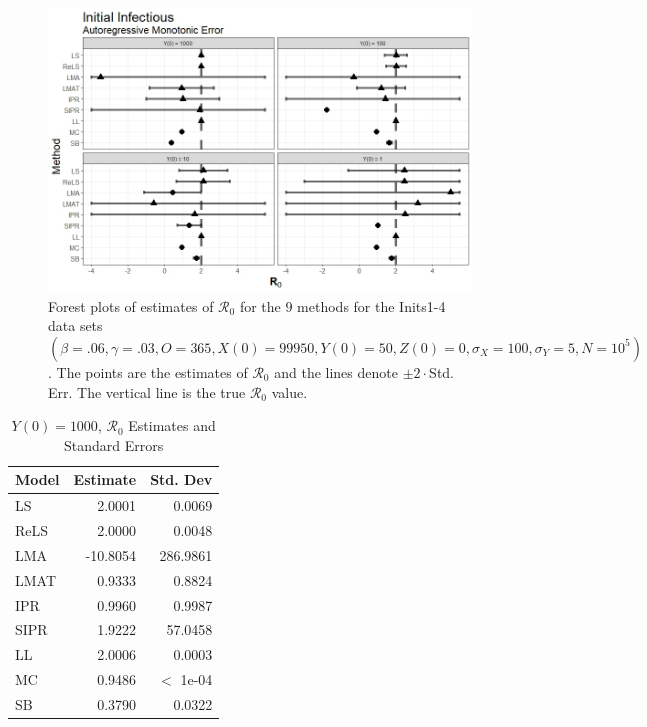 \documentclass[12pt]{article}
\newcommand{\xxsir}{\ensuremath{9} } %
\newcommand{\rr}{\ensuremath{\mathcal{R}_0}}
\begin{document}
\begin{figure}[H]
	\centering
	\includegraphics[scale=0.5]{images/start_arm.jpeg}
	\caption{Forest plots of estimates of $\rr$ for the \xxsir methods for the Inits1-4 data sets $(\beta=.06, \gamma=.03, O=365, X(0)=99950, Y(0)=50, Z(0)=0, \sigma_X=100, \sigma_Y=5, N=10^5)$.  The points are the estimates of $\rr$ and the lines denote $\pm 2\cdot $Std. Err.  The vertical line is the true $\rr$ value.}
\end{figure}


\begin{table}[H]
	
	\centering
	\begin{tabular}[t]{l|r|r}
		\hline
		Model & Estimate & Std. Dev\\
		\hline
		LS & 2.0001 & 0.0069\\
		\hline
		ReLS & 2.0000 & 0.0048\\
		\hline
		LMA & -10.8054 & 286.9861\\
		\hline
		LMAT & 0.9333 & 0.8824\\
		\hline
		IPR & 0.9960 & 0.9987\\
		\hline
		SIPR & 1.9222 & 57.0458\\
		\hline
		LL & 2.0006 & 0.0003\\
		\hline
		MC & 0.9486 & $<$ 1e-04\\
		\hline
		SB & 0.3790 & 0.0322\\
		\hline
	\end{tabular}
	\caption{$Y(0) = 1000$, $\rr$ Estimates and Standard Errors}
\end{table}
\end{document}
